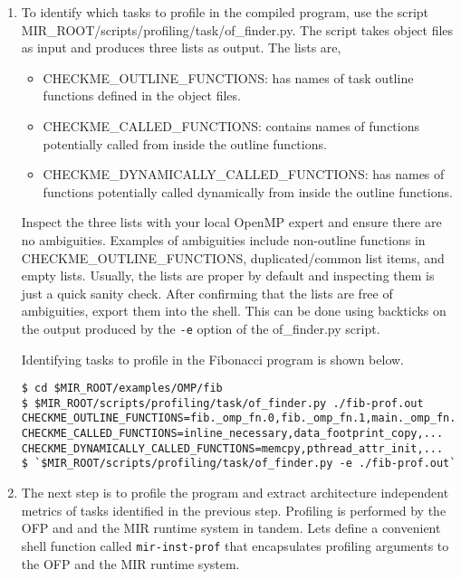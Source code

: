 \documentclass[11pt,a4paper]{article}
\begin{document}
\begin{enumerate}
    \item To identify which tasks to profile in the compiled program, use the script \textsf{MIR\_ROOT/scripts/profiling/task/of\_finder.py}. The script takes object files as input and produces three lists as output. The lists are,
        \begin{itemize}
            \item \textsf{CHECKME\_OUTLINE\_FUNCTIONS}: has names of task outline functions defined in the object files.
            \item \textsf{CHECKME\_CALLED\_FUNCTIONS}: contains names of functions potentially called from inside the outline functions.
            \item \textsf{CHECKME\_DYNAMICALLY\_CALLED\_FUNCTIONS}: has names of functions potentially called dynamically from inside the outline functions.
        \end{itemize}

Inspect the three lists with your local OpenMP expert and ensure there are no ambiguities. Examples of ambiguities include non-outline functions in \textsf{CHECKME\_OUTLINE\_FUNCTIONS}, duplicated/common list items, and empty lists. Usually, the lists are proper by default and inspecting them is just a quick sanity check. After confirming that the lists are free of ambiguities, export them into the shell. This can be done using backticks on the output produced by the \texttt{-e} option of the \textsf{of\_finder.py} script.

Identifying tasks to profile in the Fibonacci program is shown below.

\begin{lstlisting}[style=MyInputStyle]
$ cd $MIR_ROOT/examples/OMP/fib
$ $MIR_ROOT/scripts/profiling/task/of_finder.py ./fib-prof.out
CHECKME_OUTLINE_FUNCTIONS=fib._omp_fn.0,fib._omp_fn.1,main._omp_fn.2,main._omp_fn.3
CHECKME_CALLED_FUNCTIONS=inline_necessary,data_footprint_copy,...
CHECKME_DYNAMICALLY_CALLED_FUNCTIONS=memcpy,pthread_attr_init,...
$ `$MIR_ROOT/scripts/profiling/task/of_finder.py -e ./fib-prof.out`
\end{lstlisting}

    \item The next step is to profile the program and extract architecture independent metrics of tasks identified in the previous step. Profiling is performed by the OFP and and the MIR runtime system in tandem. Lets define a convenient shell function called \texttt{mir-inst-prof} that encapsulates profiling arguments to the OFP and the MIR runtime system.


\end{enumerate}
\end{document}
